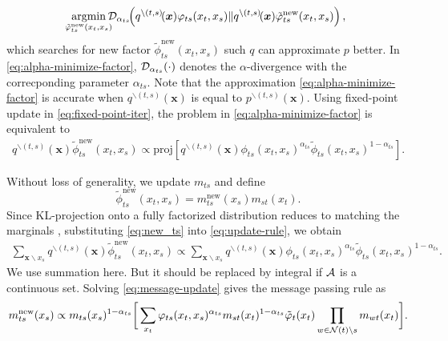 \begin{equation}\label{eq:alpha-minimize-factor}
  \!\!\!\uargmin{\tilde{\phi}_{ts}^{\mathrm{new}}(x_t, x_s)}\!\!\!\!
  \Dd_{\alpha_{ts}}\!\!\left( q^{\backslash (t,s)}\!(\bm{x}){\phi}_{ts}(x_t, x_s)
    \|q^{\backslash (t,s)}\!(\bm{x})\tilde{\phi}_{ts}^{\mathrm{new}}(x_t, x_s) \right),
\end{equation}
which searches for new factor $\tilde{\phi}_{ts}^{\mathrm{new}}(x_t, x_s)$ such $q$ can approximate $p$ better. In \eqref{eq:alpha-minimize-factor}, $\mathcal{D}_{\alpha_{ts}}(\cdot)$ denotes the $\alpha$-divergence with the correcponding parameter $\alpha_{ts}$. Note that the approximation \eqref{eq:alpha-minimize-factor} is accurate when $q^{\backslash (t,s)}(\bm{x})$ is equal to $p^{\backslash (t,s)}(\bm{x})$. 
Using fixed-point update in \eqref{eq:fixed-point-iter}, the problem in \eqref{eq:alpha-minimize-factor} is equivalent to
\begin{align}\label{eq:update-rule}
  q^{\backslash (t,s)}(\bm{x})\tilde{\phi}_{ts}^{\mathrm{new}}(x_t, x_s) \propto
  \mathrm{proj}\left[ q^{\backslash
  (t,s)}(\bm{x}){\phi}_{ts}(x_t, x_s)^{\alpha_{ts}} \tilde{\phi}_{ts}(x_t, x_s)^{1-\alpha_{ts}} \right]. 
\end{align}

Without loss of generality, we update $m_{ts}$ and define
\begin{equation}\label{eq:new_ts}
  \tilde{\phi}_{ts}^{\mathrm{new}}(x_t, x_s) = m_{ts}^{\mathrm{new}}(x_s) m_{st}(x_t).
\end{equation}
Since KL-projection onto a fully factorized distribution reduces to matching the marginals \cite[Proposition~8.3]{koller2009pgm}, substituting \eqref{eq:new_ts} into \eqref{eq:update-rule}, we obtain
\begin{align}\label{eq:message-update}
  \sum_{\bm{x}\backslash x_s} q^{\backslash (t,s)}(\bm{x}) \tilde{\phi}_{ts}^{\mathrm{new}}(x_t, x_s) 
  \propto \sum_{\bm{x}\backslash x_s} q^{\backslash (t,s)}(\bm{x}) \phi_{ts}(x_t, x_s)^{\alpha_{ts}} \tilde{\phi}_{ts}(x_t, x_s)^{1-\alpha_{ts}}.
\end{align}
We use summation here. But it should be replaced by integral if $\mathcal{A}$ is a continuous set.
Solving \eqref{eq:message-update} gives the message passing rule as
\begin{align}\label{eq:message-rule-pairwise}
  {m}^{\text{new}}_{ts}(x_s) \propto  m_{ts}(x_s)^{1-\alpha_{ts}} \bigg[\sum_{x_t} \varphi_{ts}(x_t, x_s)^{\alpha_{ts}} {m}_{st}(x_t)^{1-\alpha_{ts}}\tilde{\varphi}_t(x_t) \prod_{w\in \mathcal{N}(t)\backslash s}m_{wt}(x_t) \bigg].
\end{align}

